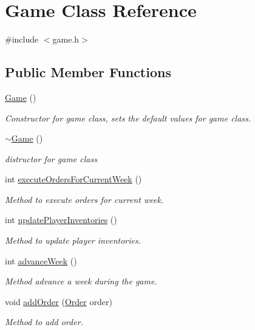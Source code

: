 \hypertarget{class_game}{}\section{Game Class Reference}
\label{class_game}


{\ttfamily \#include $<$game.\+h$>$}

\subsection*{Public Member Functions}
\begin{DoxyCompactItemize}
\item 
\hyperlink{class_game_ad59df6562a58a614fda24622d3715b65}{Game} ()
\begin{DoxyCompactList}\small\item\em Constructor for game class, sets the default values for game class. \end{DoxyCompactList}\item 
\hyperlink{class_game_ae3d112ca6e0e55150d2fdbc704474530}{$\sim$\+Game} ()
\begin{DoxyCompactList}\small\item\em distructor for game class \end{DoxyCompactList}\item 
int \hyperlink{class_game_aa48501c52deee3c167334844e72a16b9}{execute\+Orders\+For\+Current\+Week} ()
\begin{DoxyCompactList}\small\item\em Method to execute orders for current week. \end{DoxyCompactList}\item 
int \hyperlink{class_game_a87b96a8975a2db552b1f556f488211c3}{update\+Player\+Inventories} ()
\begin{DoxyCompactList}\small\item\em Method to update player inventories. \end{DoxyCompactList}\item 
int \hyperlink{class_game_a8471ea91ed18fc2d289eb23747d11d39}{advance\+Week} ()
\begin{DoxyCompactList}\small\item\em Method advance a week during the game. \end{DoxyCompactList}\item 
void \hyperlink{class_game_a0e6b1f8c9d598c7eb860d04c218fa546}{add\+Order} (\hyperlink{class_order}{Order} order)
\begin{DoxyCompactList}\small\item\em Method to add order. \end{DoxyCompactList}\item 

\end{DoxyCompactItemize}
